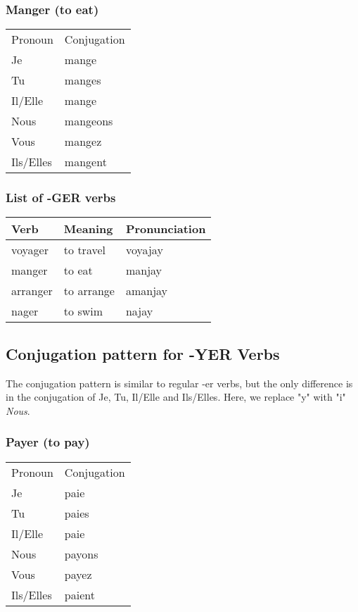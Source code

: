 \subsubsection{Manger (to eat)}
\begin{tabular}{| l | l |}
\hline
Pronoun 	& 	Conjugation	\\
Je		&	mange		\\
Tu		&	manges		\\
Il/Elle		&	mange		\\
Nous		&	mangeons	\\
Vous		&	mangez		\\
Ils/Elles	&	mangent		\\
\hline
\end{tabular}

\subsubsection{List of -GER verbs}
\begin{longtable}{| l | l | l |}
\hline
Verb 		& Meaning 		& Pronunciation	\\
\hline
\endhead
voyager 	& to travel		& voyajay	\\  \hline
manger		& to eat		& manjay	\\  \hline
arranger	& to arrange	& amanjay	\\  \hline
nager       & to swim       & najay		\\  \hline
\end{longtable}

\subsection{Conjugation pattern for -YER Verbs}
The conjugation pattern is similar to regular -er verbs, but the only difference is in the conjugation of 
Je, Tu, Il/Elle and Ils/Elles. Here, we replace "y" with "i" \emph{Nous}.

\subsubsection{Payer (to pay)}
\begin{tabular}{| l | l |}
\hline
Pronoun 	& 	Conjugation	\\
Je		&	paie		\\
Tu		&	paies		\\
Il/Elle		&	paie		\\
Nous		&	payons	\\
Vous		&	payez		\\
Ils/Elles	&	paient		\\
\hline
\end{tabular}

